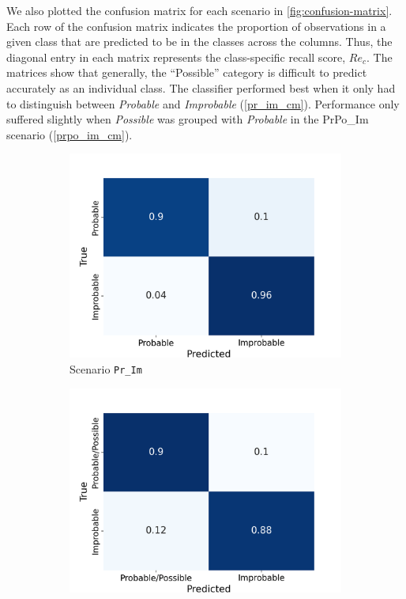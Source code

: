 \documentclass[Journal,letterpaper, SingleSpace, InsideFigs]{ascelike-new}
\begin{document}
We also plotted the confusion matrix for each scenario in \autoref{fig:confusion-matrix}.
Each row of the confusion matrix indicates the proportion of observations in a given class that are predicted to be in the classes across the columns.
Thus, the diagonal entry in each matrix represents the class-specific recall score, $Re_{c}$.
The matrices show that generally, the ``Possible'' category is difficult to predict accurately as an individual class.
The classifier performed best when it only had to distinguish between \textit{Probable} and \textit{Improbable} (\autoref{pr_im_cm}). Performance only suffered slightly when \textit{Possible} was grouped with \textit{Probable} in the PrPo\_Im scenario (\autoref{prpo_im_cm}).

\begin{figure}[ht]
  \centering
  \begin{subfigure}[t]{.45\linewidth}
    \centering
    \includegraphics[width=\linewidth, trim={0 0 1cm 1cm}, clip]{opt-confusion-matrix-Pr_Im-128-px.png}
    \caption{Scenario \texttt{Pr\_Im}}
    \label{pr_im_cm}
  \end{subfigure}%
   \begin{subfigure}[t]{.45\linewidth}
    \centering
    \includegraphics[width=\linewidth, trim={0 0 1cm 1cm}, clip]{opt-confusion-matrix-PrPo_Im-128-px.png}

\end{subfigure}
\end{figure}
\end{document}
